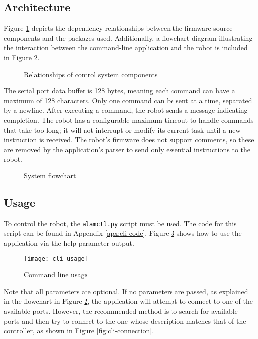\subsection{Architecture}

Figure \ref{fig:firmware-uml} depicts the dependency relationships between the firmware source components and the packages used. Additionally, a flowchart diagram illustrating the interaction between the command-line application and the robot is included in Figure \ref{fig:system-flowchart}.

\begin{figure}[H]
    \centering
    
    \caption{Relationships of control system components}
    \label{fig:firmware-uml}
\end{figure}


The serial port data buffer is 128 bytes, meaning each command can have a maximum of 128 characters. Only one command can be sent at a time, separated by a newline. After executing a command, the robot sends a message indicating completion. The robot has a configurable maximum timeout to handle commands that take too long; it will not interrupt or modify its current task until a new instruction is received. The robot's firmware does not support comments, so these are removed by the application's parser to send only essential instructions to the robot.

\begin{figure}[H]
    \centering
    
    \caption{System flowchart}
    \label{fig:system-flowchart}
\end{figure}


\subsection{Usage}

To control the robot, the \texttt{alamctl.py} script must be used. The code for this script can be found in Appendix \ref{apx:cli-code}. Figure \ref{fig:cli-usage} shows how to use the application via the help parameter output.


\begin{figure}[H]
    \centering
    \texttt{[image: cli-usage]}
    \caption{Command line usage}
    \label{fig:cli-usage}
\end{figure}

Note that all parameters are optional. If no parameters are passed, as explained in the flowchart in Figure \ref{fig:system-flowchart}, the application will attempt to connect to one of the available ports. However, the recommended method is to search for available ports and then try to connect to the one whose description matches that of the controller, as shown in Figure \ref{fig:cli-connection}.

